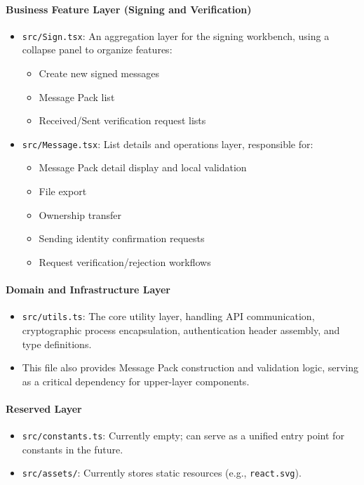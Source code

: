 \documentclass[letterpaper,11pt]{article}
\begin{document}
\paragraph{Business Feature Layer (Signing and Verification)}
\begin{itemize}[leftmargin=2em]
    \item \texttt{src/Sign.tsx}: An aggregation layer for the signing workbench, using a collapse panel to organize features:
          \begin{itemize}[leftmargin=2em]
              \item Create new signed messages
              \item Message Pack list
              \item Received/Sent verification request lists
          \end{itemize}
    \item \texttt{src/Message.tsx}: List details and operations layer, responsible for:
          \begin{itemize}[leftmargin=2em]
              \item Message Pack detail display and local validation
              \item File export
              \item Ownership transfer
              \item Sending identity confirmation requests
              \item Request verification/rejection workflows
          \end{itemize}
\end{itemize}

\paragraph{Domain and Infrastructure Layer}
\begin{itemize}[leftmargin=2em]
    \item \texttt{src/utils.ts}: The core utility layer, handling API communication, cryptographic process encapsulation, authentication header assembly, and type definitions.
    \item This file also provides Message Pack construction and validation logic, serving as a critical dependency for upper-layer components.
\end{itemize}

\paragraph{Reserved Layer}
\begin{itemize}[leftmargin=2em]
    \item \texttt{src/constants.ts}: Currently empty; can serve as a unified entry point for constants in the future.
    \item \texttt{src/assets/}: Currently stores static resources (e.g., \texttt{react.svg}).
\end{itemize}
\end{document}
